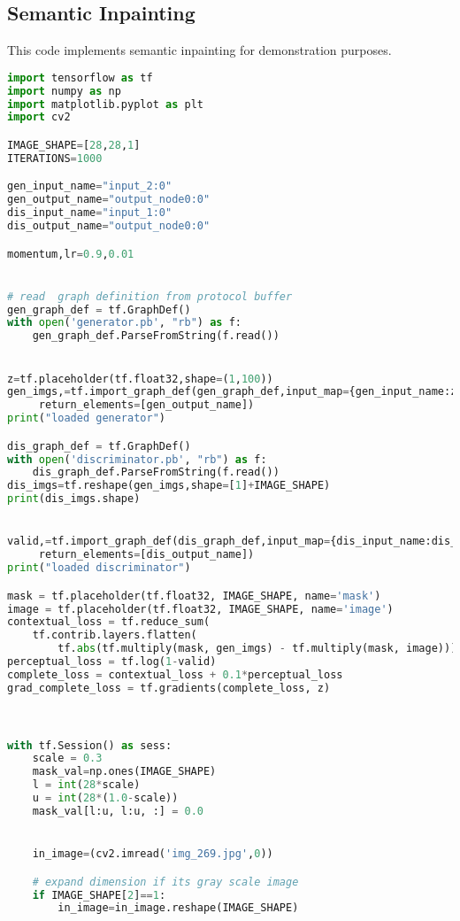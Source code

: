\subsection{Semantic Inpainting} %
\label{sub:semantic_inpainting}
This code implements semantic inpainting for demonstration purposes.
\begin{lstlisting}[basicstyle=\scriptsize,language=Python]
import tensorflow as tf
import numpy as np
import matplotlib.pyplot as plt
import cv2

IMAGE_SHAPE=[28,28,1]
ITERATIONS=1000

gen_input_name="input_2:0"
gen_output_name="output_node0:0"
dis_input_name="input_1:0"
dis_output_name="output_node0:0"

momentum,lr=0.9,0.01


# read  graph definition from protocol buffer
gen_graph_def = tf.GraphDef()
with open('generator.pb', "rb") as f:
    gen_graph_def.ParseFromString(f.read())


z=tf.placeholder(tf.float32,shape=(1,100))
gen_imgs,=tf.import_graph_def(gen_graph_def,input_map={gen_input_name:z},
     return_elements=[gen_output_name])
print("loaded generator")

dis_graph_def = tf.GraphDef()
with open('discriminator.pb', "rb") as f:
    dis_graph_def.ParseFromString(f.read())
dis_imgs=tf.reshape(gen_imgs,shape=[1]+IMAGE_SHAPE)
print(dis_imgs.shape)


valid,=tf.import_graph_def(dis_graph_def,input_map={dis_input_name:dis_imgs},
     return_elements=[dis_output_name])
print("loaded discriminator")

mask = tf.placeholder(tf.float32, IMAGE_SHAPE, name='mask')
image = tf.placeholder(tf.float32, IMAGE_SHAPE, name='image')
contextual_loss = tf.reduce_sum(
    tf.contrib.layers.flatten(
        tf.abs(tf.multiply(mask, gen_imgs) - tf.multiply(mask, image))), 1)
perceptual_loss = tf.log(1-valid)
complete_loss = contextual_loss + 0.1*perceptual_loss
grad_complete_loss = tf.gradients(complete_loss, z)



with tf.Session() as sess:
    scale = 0.3
    mask_val=np.ones(IMAGE_SHAPE)
    l = int(28*scale)
    u = int(28*(1.0-scale))
    mask_val[l:u, l:u, :] = 0.0


    in_image=(cv2.imread('img_269.jpg',0))

    # expand dimension if its gray scale image
    if IMAGE_SHAPE[2]==1:
        in_image=in_image.reshape(IMAGE_SHAPE)


\end{lstlisting}
